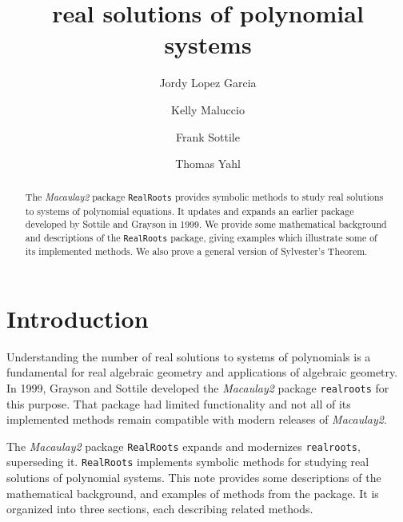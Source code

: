 \documentclass[12pt]{amsart}
\title{real solutions of polynomial systems}
\author[J.~Lopez Garcia]{Jordy Lopez Garcia}
\author[K.~Maluccio]{Kelly Maluccio}
\author[F.~Sottile]{Frank Sottile}
\author[T.~Yahl]{Thomas Yahl}
\theoremstyle{definition}
\begin{document}
\begin{abstract}
 The \textit{Macaulay2} package \texttt{RealRoots} provides symbolic methods to study real solutions to systems of polynomial equations.
 It updates and expands an earlier package developed by Sottile and Grayson in 1999.
 We provide some mathematical background and descriptions of the  \texttt{RealRoots} package, giving examples which illustrate some of its
 implemented methods.
 We also prove a general version of Sylvester's Theorem.
\end{abstract}

\maketitle


\section*{Introduction}


Understanding the number of real solutions to systems of polynomials is a fundamental for real algebraic geometry and applications of
algebraic geometry.
In 1999, Grayson and Sottile \cite{So_M2} developed the \textit{Macaulay2} package \texttt{realroots} for this purpose.
That package had limited functionality and not all of its implemented methods remain compatible with modern releases of \textit{Macaulay2}.

The \textit{Macaulay2} package \texttt{RealRoots} expands and modernizes \texttt{realroots}, superseding it.
\texttt{RealRoots} implements symbolic methods for studying real solutions of polynomial systems.
This note provides some descriptions of the mathematical background, and examples of methods from the package.
It is organized into three sections, each describing related methods.
\end{document}
